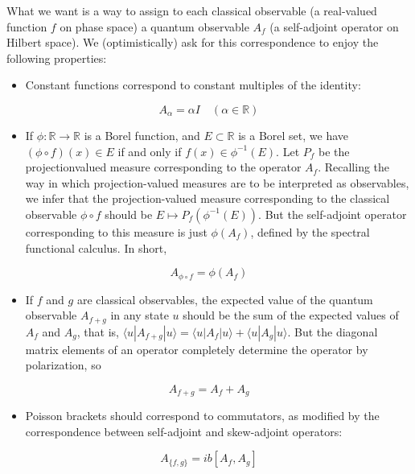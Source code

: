 \documentclass[10pt, letterpaper]{article}
\begin{document}
What we want is a way to assign to each classical observable (a real-valued function $f$ on phase space) a quantum observable $A_{f}$ (a self-adjoint operator on Hilbert space). We (optimistically) ask for this correspondence to enjoy the following properties:

\begin{itemize}
  \item Constant functions correspond to constant multiples of the identity:
\end{itemize}

$$
A_{\alpha}=\alpha I \quad(\alpha \in \mathbb{R})
$$

\begin{itemize}
  \item If $\phi: \mathbb{R} \rightarrow \mathbb{R}$ is a Borel function, and $E \subset \mathbb{R}$ is a Borel set, we have $(\phi \circ f)(x) \in E$ if and only if $f(x) \in \phi^{-1}(E)$. Let $P_{f}$ be the projectionvalued measure corresponding to the operator $A_{f}$. Recalling the way in which projection-valued measures are to be interpreted as observables, we infer that the projection-valued measure corresponding to the classical observable $\phi \circ f$ should be $E \mapsto P_{f}\left(\phi^{-1}(E)\right)$. But the self-adjoint operator corresponding to this measure is just $\phi\left(A_{f}\right)$, defined by the spectral functional calculus. In short,
\end{itemize}

$$
A_{\phi \circ f}=\phi\left(A_{f}\right)
$$

\begin{itemize}
  \item If $f$ and $g$ are classical observables, the expected value of the quantum observable $A_{f+g}$ in any state $u$ should be the sum of the expected values of $A_{f}$ and $A_{g}$, that is, $\langle u| A_{f+g}|u\rangle=\langle u| A_{f}|u\rangle+\langle u| A_{g}|u\rangle$. But the diagonal matrix elements of an operator completely determine the operator by polarization, so
\end{itemize}

$$
A_{f+g}=A_{f}+A_{g}
$$

\begin{itemize}
  \item Poisson brackets should correspond to commutators, as modified by the correspondence between self-adjoint and skew-adjoint operators:
\end{itemize}

$$
A_{\{f, g\}}=i b\left[A_{f}, A_{g}\right]
$$
\end{document}
